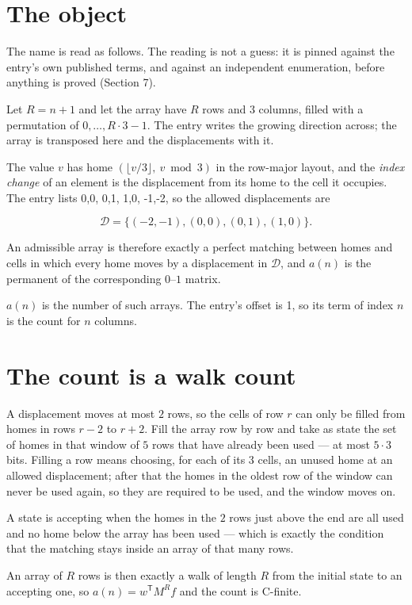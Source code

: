 \documentclass[11pt]{article}
\theoremstyle{definition}
\begin{document}
\section{The object}

The name is read as follows. The reading is not a guess: it is pinned against the entry's own published terms, and against an independent enumeration, before anything is proved (Section 7).

Let $R = n + 1$ and let the array have $R$ rows and $3$ columns, filled with a permutation of $0,\dots,R\cdot3-1$. The entry writes the growing direction across; the array is transposed here and the displacements with it.

The value $v$ has home $(\lfloor v/3\rfloor,\ v \bmod 3)$ in the row-major layout, and the {\itshape index change} of an element is the displacement from its home to the cell it occupies. The entry lists 0,0, 0,1, 1,0, -1,-2, so the allowed displacements are

\[\mathcal{D} = \{(-2,-1), (0,0), (0,1), (1,0)\}.\]

An admissible array is therefore exactly a perfect matching between homes and cells in which every home moves by a displacement in $\mathcal{D}$, and $a(n)$ is the permanent of the corresponding $0$--$1$ matrix.

$a(n)$ is the number of such arrays. The entry's offset is 1, so its term of index $n$ is the count for $n$ columns.

\section{The count is a walk count}

A displacement moves at most $2$ rows, so the cells of row $r$ can only be filled from homes in rows $r-2$ to $r+2$. Fill the array row by row and take as state the set of homes in that window of $5$ rows that have already been used --- at most $5\cdot3$ bits. Filling a row means choosing, for each of its $3$ cells, an unused home at an allowed displacement; after that the homes in the oldest row of the window can never be used again, so they are required to be used, and the window moves on.

A state is accepting when the homes in the $2$ rows just above the end are all used and no home below the array has been used --- which is exactly the condition that the matching stays inside an array of that many rows.

An array of $R$ rows is then exactly a walk of length $R$ from the initial state to an accepting one, so $a(n) = w^{\mathsf T}M^{R}f$ and the count is C-finite.
\end{document}
